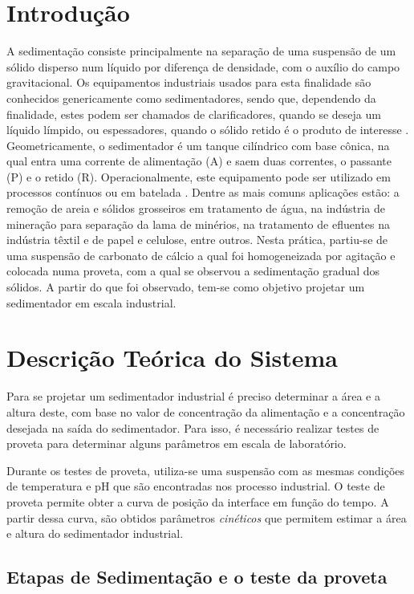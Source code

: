 \chapter{Introdução}

A sedimentação consiste principalmente na separação de uma suspensão de um sólido disperso num líquido por diferença de densidade, com o auxílio do campo gravitacional. Os equipamentos industriais usados para esta finalidade são conhecidos genericamente como sedimentadores, sendo que, dependendo da finalidade, estes podem ser chamados de clarificadores, quando se deseja um líquido límpido, ou espessadores, quando o sólido retido é o produto de interesse \citep{pecanha, unicamp}.
Geometricamente, o sedimentador é um tanque cilíndrico com base cônica, na qual entra uma corrente de alimentação (A) e saem duas correntes, o passante (P) e o retido (R). Operacionalmente, este equipamento pode ser utilizado em processos contínuos ou em batelada \citep{pecanha, unicamp}. Dentre as mais comuns aplicações estão: a remoção de areia e sólidos grosseiros em tratamento de água, na indústria de mineração para separação da lama de minérios, na tratamento de efluentes na indústria têxtil e de papel e celulose, entre outros.
Nesta prática, partiu-se de uma suspensão de carbonato de cálcio a qual foi homogeneizada por agitação e colocada numa proveta, com a qual se observou a sedimentação gradual dos sólidos. A partir do que foi observado, tem-se como objetivo projetar um sedimentador em escala industrial.


\chapter{Descrição Teórica do Sistema}


Para se projetar um sedimentador industrial é preciso determinar a área e a altura deste, com base no valor de concentração da alimentação e a concentração desejada na saída do sedimentador. Para isso, é necessário realizar testes de proveta para determinar alguns parâmetros em escala de laboratório.

Durante os testes de proveta, utiliza-se uma suspensão com as mesmas condições de temperatura e pH que são encontradas nos processo industrial. O teste de proveta permite obter a curva de posição da interface em função do tempo. A partir dessa curva, são obtidos parâmetros \emph{cinéticos} que permitem estimar a área e altura do sedimentador industrial.


\section{Etapas de Sedimentação e o teste da proveta}

